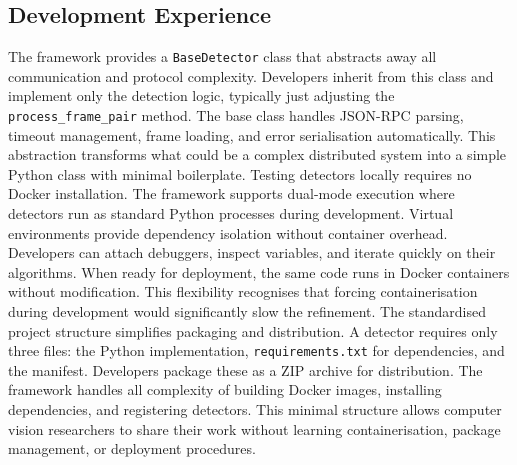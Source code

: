 \subsection{Development Experience}
The framework provides a \texttt{BaseDetector} class that abstracts away all communication and protocol complexity. Developers inherit from this class and implement only the detection logic, typically just adjusting the \texttt{process\_frame\_pair} method. The base class handles JSON-RPC parsing, timeout management, frame loading, and error serialisation automatically. This abstraction transforms what could be a complex distributed system into a simple Python class with minimal boilerplate.
Testing detectors locally requires no Docker installation. The framework supports dual-mode execution where detectors run as standard Python processes during development. Virtual environments provide dependency isolation without container overhead. Developers can attach debuggers, inspect variables, and iterate quickly on their algorithms. When ready for deployment, the same code runs in Docker containers without modification. This flexibility recognises that forcing containerisation during development would significantly slow the refinement.
The standardised project structure simplifies packaging and distribution. A detector requires only three files: the Python implementation, \texttt{requirements.txt} for dependencies, and the manifest. Developers package these as a ZIP archive for distribution. The framework handles all complexity of building Docker images, installing dependencies, and registering detectors. This minimal structure allows computer vision researchers to share their work without learning containerisation, package management, or deployment procedures.
